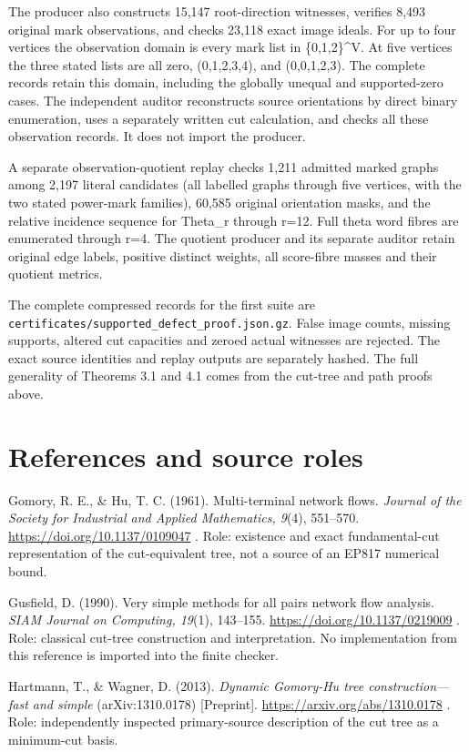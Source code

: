 The producer also constructs 15,147 root-direction witnesses, verifies 8,493 original mark observations, and checks 23,118 exact image ideals. For up to four vertices the observation domain is every mark list in \{0,1,2\}\^{}V. At five vertices the three stated lists are all zero, (0,1,2,3,4), and (0,0,1,2,3). The complete records retain this domain, including the globally unequal and supported-zero cases. The independent auditor reconstructs source orientations by direct binary enumeration, uses a separately written cut calculation, and checks all these observation records. It does not import the producer.

A separate observation-quotient replay checks 1,211 admitted marked graphs among 2,197 literal candidates (all labelled graphs through five vertices, with the two stated power-mark families), 60,585 original orientation masks, and the relative incidence sequence for Theta\_r through r=12. Full theta word fibres are enumerated through r=4. The quotient producer and its separate auditor retain original edge labels, positive distinct weights, all score-fibre masses and their quotient metrics.

The complete compressed records for the first suite are \nolinkurl{certificates/supported_defect_proof.json.gz}. False image counts, missing supports, altered cut capacities and zeroed actual witnesses are rejected. The exact source identities and replay outputs are separately hashed. The full generality of Theorems 3.1 and 4.1 comes from the cut-tree and path proofs above.

\section{References and source roles}\label{n11-references-and-source-roles}

Gomory, R. E., \& Hu, T. C. (1961). Multi-terminal network flows. \emph{Journal of the Society for Industrial and Applied Mathematics, 9}(4), 551--570. \url{https://doi.org/10.1137/0109047} . Role: existence and exact fundamental-cut representation of the cut-equivalent tree, not a source of an EP817 numerical bound.

Gusfield, D. (1990). Very simple methods for all pairs network flow analysis. \emph{SIAM Journal on Computing, 19}(1), 143--155. \url{https://doi.org/10.1137/0219009} . Role: classical cut-tree construction and interpretation. No implementation from this reference is imported into the finite checker.

Hartmann, T., \& Wagner, D. (2013). \emph{Dynamic Gomory-Hu tree construction---fast and simple} (arXiv:1310.0178) {[}Preprint{]}. \url{https://arxiv.org/abs/1310.0178} . Role: independently inspected primary-source description of the cut tree as a minimum-cut basis.

